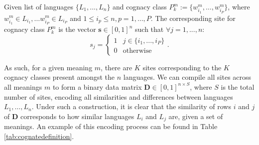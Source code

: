 \begin{definition} [Site]
    Given list of languages $\{L_1, ..., L_n\}$ and cognacy class $P_k^m := \{w_{i_1}^m, \dots, w_{i_P}^m \}$, where $w_{i_1}^m \in L_{i_1}, \dots w_{i_P}^m \in L_{i_P}$ and $1 \leq i_p \leq n, p = 1, \dots, P$. The corresponding site for cognacy class $P_k^m$ is the vector $\mathbf{s} \in [0, 1]^n$ such that $\forall j = 1, ..., n$:
    \begin{equation}
    \label{eqn:sitedefinitioneqn}
        s_j = \begin{cases}
            1 & j \in \{i_1, ..., i_P\} \\
            0 & \text{otherwise}
        \end{cases}.
    \end{equation}
\end{definition}

As such, for a given meaning $m$, there are $K$ sites corresponding to the $K$ cognacy classes present amongst the $n$ languages. We can compile all sites across all meanings $m$ to form a binary data matrix $\mathbf{D} \in [0, 1]^{n \times S}$, where $S$ is the total number of sites, encoding all similarities and differences between languages $L_1, \dots, L_n$. Under such a construction, it is clear that the similarity of rows $i$ and $j$ of $\mathbf{D}$ corresponds to how similar languages $L_i$ and $L_j$ are, given a set of meanings. An example of this encoding process can be found in Table \ref{tab:cognatedefinition}.

